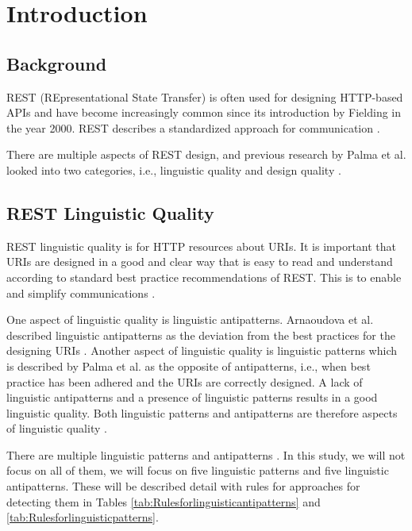 \section{Introduction}

\subsection{Background}
REST (REpresentational State Transfer) is often used for designing HTTP-based APIs and have become increasingly common since its introduction by Fielding in the year 2000. REST describes a standardized approach for communication \cite{restdissertation}.

There are multiple aspects of REST design, and previous research by Palma et al. looked into two categories, i.e., linguistic quality and design quality \cite{design}\cite{linguistic}.

\subsection{REST Linguistic Quality}

REST linguistic quality is for HTTP resources about URIs. It is important that URIs are designed in a good and clear way that is easy to read and understand according to standard best practice recommendations of REST. This is to enable and simplify communications \cite{restdissertation}\cite{linguistic}. 


One aspect of linguistic quality is linguistic antipatterns. Arnaoudova et al. described linguistic antipatterns as the deviation from the best practices for the designing URIs \cite{arnaoudova}. Another aspect of linguistic quality is linguistic patterns which is described by Palma et al. as the opposite of antipatterns, i.e., when best practice has been adhered and the URIs are correctly designed. A lack of linguistic antipatterns and a presence of linguistic patterns results in a good linguistic quality. Both linguistic patterns and antipatterns are therefore aspects of linguistic quality \cite{linguistic}.

There are multiple linguistic patterns and antipatterns \cite{linguistic}. In this study, we will not focus on all of them, we will focus on five linguistic patterns and five linguistic antipatterns. These will be described detail with rules for approaches for detecting them in Tables \ref{tab:Rulesforlinguisticantipatterns} and \ref{tab:Rulesforlinguisticpatterns}. %

